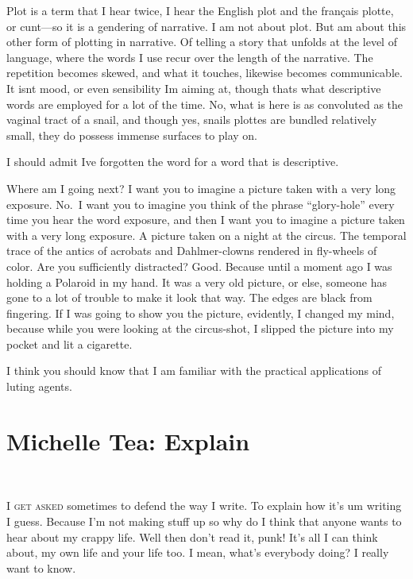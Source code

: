 \documentclass[
]{memoir}
\begin{document}
Plot is a term that I hear twice, I hear the English plot and the
français plotte, or cunt---so it is a gendering of narrative. I am not
about plot. But am about this other form of plotting in narrative. Of
telling a story that unfolds at the level of language, where the words I
use recur over the length of the narrative. The repetition becomes
skewed, and what it touches, likewise becomes communicable. It isnt
mood, or even sensibility Im aiming at, though thats what descriptive
words are employed for a lot of the time. No, what is here is as
convoluted as the vaginal tract of a snail, and though yes, snails
plottes are bundled relatively small, they do possess immense surfaces
to play on.

I should admit Ive forgotten the word for a word that is descriptive.

Where am I going next? I want you to imagine a picture taken with a very
long exposure. No.~I want you to imagine you think of the phrase
``glory-hole'' every time you hear the word exposure, and then I want
you to imagine a picture taken with a very long exposure. A picture
taken on a night at the circus. The temporal trace of the antics of
acrobats and Dahlmer-clowns rendered in fly-wheels of color. Are you
sufficiently distracted? Good. Because until a moment ago I was holding
a Polaroid in my hand. It was a very old picture, or else, someone has
gone to a lot of trouble to make it look that way. The edges are black
from fingering. If I was going to show you the picture, evidently, I
changed my mind, because while you were looking at the circus-shot, I
slipped the picture into my pocket and lit a cigarette.

I think you should know that I am familiar with the practical
applications of luting agents.

\hypertarget{michelle-tea-explain}{%
\chapter{Michelle Tea: Explain}\label{michelle-tea-explain}}

~

\lettrine[lines=3, findent=0em, nindent=0.1em, lhang=0]{I}{ get asked}
sometimes to defend the way I write. To explain how it's um writing I
guess. Because I'm not making stuff up so why do I think that anyone
wants to hear about my crappy life. Well then don't read it, punk! It's
all I can think about, my own life and your life too. I mean, what's
everybody doing? I really want to know.
\end{document}
